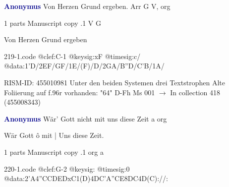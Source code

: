 \documentclass[twocolumn]{book}
\begin{document}
\newline \par \vspace{7pt} \textcolor{darkblue}{\textbf{Anonymus  }}
\newline Von Herzen Grund ergeben. Arr  G  
\newline V, org
\newline \begin{itshape}\end{itshape} 
\newline \textcolor{darkblue}{}  1 parts  
\newline Manuscript copy
.1  V  G
\newline \begin{footnotesize} Von Herzen Grund ergeben \end{footnotesize}  
\begin{filecontents*}{219-1.code}
@clef:C-1
@keysig:xF
@timesig:c/
@data:1'D/2EF/GF/1E/(F)/D/2GA/B''D/C'B/1A/
\end{filecontents*}
\newline
%

\newline RISM-ID: 455010981
\newline Unter den beiden Systemen drei Textstrophen
\newline Alte Foliierung auf f.96r vorhanden: "64"
\newline D-Fh  Ms 001
\newline $\rightarrow$ In collection 418 (455008343)

\newline \par \vspace{7pt} \textcolor{darkblue}{\textbf{Anonymus  }}
\newline Wär' Gott nicht mit uns diese Zeit  a  
\newline org
\newline \begin{itshape}[f.20v, at left:] Wär Gott ô mit | Uns diese Zeit.\end{itshape} 
\newline \textcolor{darkblue}{}  1 parts  
\newline Manuscript copy
.1  org  a  
\begin{filecontents*}{220-1.code}
@clef:G-2
@keysig:
@timesig:0
@data:2'A4''CCDEDxC1(D)4DC'A''CE{8DC}4D(C)://:
\end{filecontents*}
\newline
%
\end{document}
